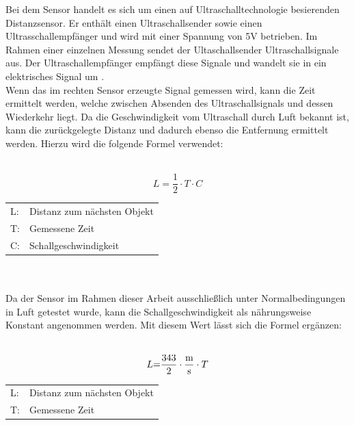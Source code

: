Bei dem Sensor handelt es sich um einen auf Ultraschalltechnologie besierenden Distanzsensor. Er enthält einen Ultraschallsender sowie einen Ultrasschallempfänger und wird mit einer Spannung von 5V betrieben. Im Rahmen einer einzelnen Messung sendet der Ultaschallsender Ultraschallsignale aus. Der Ultraschallempfänger empfängt diese Signale und wandelt sie in ein elektrisches Signal um \protect{}.\\
Wenn das im rechten Sensor erzeugte Signal gemessen wird, kann die Zeit ermittelt werden, welche zwischen Absenden des Ultraschallsignals und dessen Wiederkehr liegt. Da die Geschwindigkeit vom Ultraschall durch Luft bekannt ist, kann die zurückgelegte Distanz und dadurch ebenso die Entfernung ermittelt werden. Hierzu wird die folgende Formel verwendet:\\\\
\begin{minipage}{\linewidth}
	\begin{equation}
		L {=} \frac{1}{2} \cdot T \cdot C
	\end{equation}
	\begin{tabular}{ll}
	L: & Distanz zum nächsten Objekt \\
	T: & Gemessene Zeit \\
	C: & Schallgeschwindigkeit
	\end{tabular}
\end{minipage}\\\\
Da der Sensor im Rahmen dieser Arbeit ausschließlich unter Normalbedingungen in Luft getestet wurde, kann die Schallgeschwindigkeit als nährungsweise Konstant angenommen werden. Mit diesem Wert lässt sich die Formel ergänzen:\\\\
\begin{minipage}{\linewidth}
	\begin{equation}
		L {=} \frac{343}{2} \cdot \frac{\text{m}}{\text{s}} \cdot T\\
	\end{equation}
	\begin{tabular}{ll}
	L: & Distanz zum nächsten Objekt \\
	T: & Gemessene Zeit
	\end{tabular}
\end{minipage}\\\\


